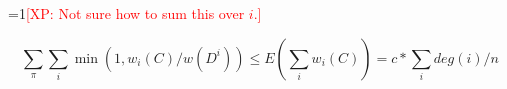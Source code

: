 \documentclass{article} %
\newcommand{\Comments}{1}
\newcommand{\note}[2]{\ifnum\Comments=1\textcolor{#1}{#2}\fi}
\newcommand{\xinghao}[1]{\note{red}{[XP: #1]}}
\begin{document}
\xinghao{Not sure how to sum this over $i$.}

\[
\sum_\pi \sum_i \min(1, w_i(C) / w(D^i)) \leq  E( \sum_i w_i(C))  =  c* \sum_i deg(i) / n
\]




{\footnotesize




}

%
\end{document}
